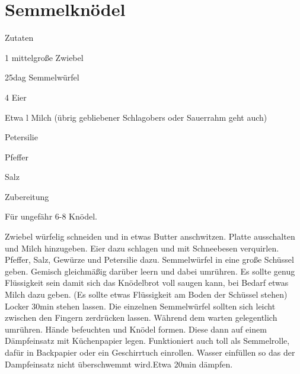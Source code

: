 \chapter*{Semmelknödel}
\begin{multicols}{2}
 {\Large Zutaten}
 \begin{Zutaten}
		\item 1 mittelgroße Zwiebel
		\item 25dag Semmelwürfel
		\item 4 Eier
		\item Etwa l Milch \left(übrig gebliebener Schlagobers oder Sauerrahm geht auch\right) 
		\item Petersilie
		\item Pfeffer
		\item Salz
		
		
\end{Zutaten}
\columnbreak
{}
\end{multicols}

{\Large Zubereitung} \newline
\begin{addmargin}[1cm]{0cm}
	Für ungefähr 6-8 Knödel.\newline\newline
	
	Zwiebel würfelig schneiden und in etwas Butter anschwitzen.\newline
	Platte ausschalten und Milch hinzugeben.\newline
	Eier dazu schlagen und mit Schneebesen verquirlen.\newline
	Pfeffer, Salz, Gewürze und Petersilie dazu.\newline
	Semmelwürfel in eine große Schüssel geben.
	Gemisch gleichmäßig darüber leern und dabei umrühren.\newline
	Es sollte genug Flüssigkeit sein damit sich das Knödelbrot voll saugen kann, bei Bedarf etwas Milch
	dazu geben. \left(Es sollte etwas Flüssigkeit am Boden der Schüssel stehen\right) \newline
	Locker 30min stehen lassen. Die einzelnen Semmelwürfel sollten sich leicht zwischen den Fingern
	zerdrücken lassen. Während dem warten gelegentlich umrühren.\newline
	Hände befeuchten und Knödel formen. Diese dann auf einem Dämpfeinsatz mit Küchenpapier legen.\newline
	Funktioniert auch toll als Semmelrolle, dafür in Backpapier oder ein Geschirrtuch einrollen.\newline
	Wasser einfüllen so das der Dampfeinsatz nicht überschwemmt wird.\newline Etwa 20min dämpfen.
	
	
\end{addmargin}
